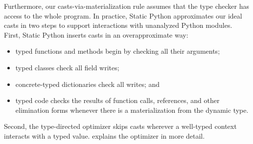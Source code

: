 \documentclass[english,cleveref,submission]{programming}
\newcommand{\SP}{Static Python}
\begin{document}
Furthermore, our casts-via-materialization rule assumes that the
type checker has access to the whole program.
In practice, \SP{} approximates our ideal casts in two steps
to support interactions with unanalyzed Python modules.
First, \SP{} inserts casts in an overapproximate way:
\begin{itemize}
  \item
    typed functions and methods begin by checking all their arguments;
  \item
    typed classes check all field writes;
  \item
    concrete-typed dictionaries check all writes; and
  \item
    typed code checks the results of function calls, references, and other elimination forms
    whenever there is a materialization from the dynamic type.
\end{itemize}
Second, the type-directed optimizer skips casts wherever a well-typed context
interacts with a typed value.
 explains the optimizer in more detail.
\end{document}
